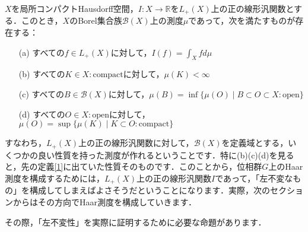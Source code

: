 \begin{ythm}[Rieszの表現定理]\label{9}
$X$を局所コンパクトHausdorff空間，$I : X \to \mathbb{R}$を$L_{+}(X)$上の正の線形汎関数とする．このとき，$X$のBorel集合族$\mathscr{B}(X)$上の測度$\mu$であって，次を満たすものが存在する：
\begin{itemize}
 \item[(a)]すべての$f \in L_{+}(X)$に対して，$I(f)=\int_{X}fd\mu$
 \item[(b)]すべての$K \in X : \mathrm{compact}$に対して，$\mu(K)<\infty$
 \item[(c)]すべての$B \in \mathscr{B}(X)$に対して，$\mu(B)=\inf \{ \mu(O) \mid B \subset O \subset X : \mathrm{open} \}$
 \item[(d)]すべての$O \in X : \mathrm{open}$に対して，$\mu(O)=\sup \{ \mu(K) \mid K \subset O : \mathrm{compact} \}$
\end{itemize}
\end{ythm}
すなわち，$L_{+}(X)$上の正の線形汎関数に対して，$\mathscr{B}(X)$を定義域とする，いくつかの良い性質を持った測度が作れるということです．特に(b)(c)(d)を見ると，先の定義\ref{1}に出ていた性質そのものです．このことから，位相群$G$上のHaar測度を構成するためには，$L_{+}(X)$上の正の線形汎関数$I$であって，「左不変なもの」を構成してしまえばよさそうだということになります．実際，次のセクションからはその方向でHaar測度を構成していきます．

その際，「左不変性」を実際に証明するために必要な命題があります．

